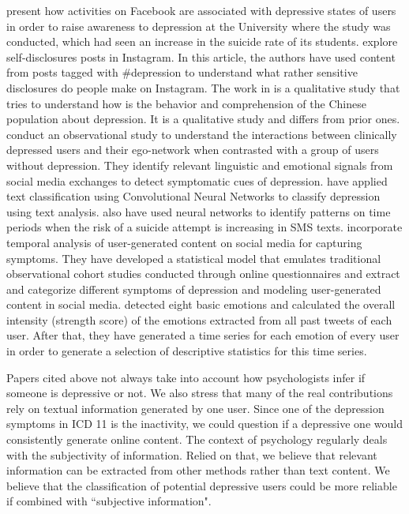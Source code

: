 \documentclass[11pt, notitlepage]{article} %
\begin{document}
\cite{Park:2015:MDL:2675133.2675139} present how activities on Facebook are associated with depressive states of users in order to raise awareness to depression at the University where the study was conducted, which had seen an increase in the suicide rate of its students.
\cite{andalibi_sensitive_2017} explore self-disclosures posts in Instagram. In this article, the authors have used content from posts tagged with \#depression to understand what rather sensitive disclosures do people make on Instagram. The work in \cite{Li2016} is a qualitative study that tries to understand how is the behavior and comprehension of the Chinese population about depression. It is a qualitative study and differs from prior ones.
\cite{Vedula2017} conduct an observational study to understand the interactions between clinically depressed users and their ego-network when contrasted with a group of users without depression. They identify relevant linguistic and emotional signals from social media exchanges to detect symptomatic cues of depression.
\cite{Zhao:2018:TCM:3302425.3302501} have applied text classification using Convolutional Neural Networks to classify depression using text analysis. \cite{Nobles:2018:IIS:3173574.3173987} also have used neural networks to identify patterns on time periods when the risk of a suicide attempt is increasing in SMS texts.
\cite{Yazdavar:2017:SAM:3110025.3123028} incorporate temporal analysis of user-generated content on social media for capturing symptoms. They have developed a statistical model that emulates traditional observational cohort studies conducted through online questionnaires and extract and categorize different symptoms of depression and modeling user-generated content in social media.
\cite{Chen2018} detected eight basic emotions and calculated the overall intensity (strength score) of the emotions extracted from all past tweets of each user. After that, they have generated a time series for each emotion of every user in order to generate a selection of descriptive statistics for this time series.

Papers cited above not always take into account how psychologists infer if someone is depressive or not. 
We also stress that many of the real contributions rely on textual information generated by one user. Since one of the depression symptoms in ICD 11 is the inactivity, we could question if a depressive one would consistently generate online content.
The context of psychology regularly deals with the subjectivity of information. Relied on that, we believe that relevant information can be extracted from other methods rather than text content. We believe that the classification of potential depressive users could be more reliable if combined with ``subjective information".
\end{document}
